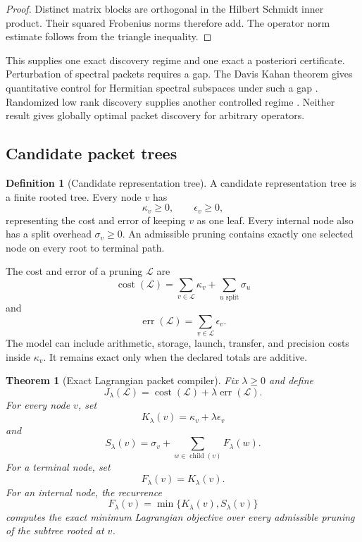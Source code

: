 \documentclass{aomart}
\newtheorem{theorem}{Theorem}[section]
\theoremstyle{definition}
\newtheorem{definition}[definition]{Definition}
\theoremstyle{remark}
\newcommand{\Lcal}{\mathcal L}
\newcommand{\cost}{\operatorname{cost}}
\newcommand{\err}{\operatorname{err}}
\begin{document}
\begin{proof}
Distinct matrix blocks are orthogonal in the Hilbert Schmidt inner product. Their squared Frobenius norms therefore add. The operator norm estimate follows from the triangle inequality.
\end{proof}

This supplies one exact discovery regime and one exact a posteriori certificate. Perturbation of spectral packets requires a gap. The Davis Kahan theorem gives quantitative control for Hermitian spectral subspaces under such a gap \cite{DavisKahan1970}. Randomized low rank discovery supplies another controlled regime \cite{HalkoMartinssonTropp2011,MartinssonTropp2020}. Neither result gives globally optimal packet discovery for arbitrary operators.

\subsection{Candidate packet trees}

\begin{definition}[Candidate representation tree]\label{def:candidate_tree}
A candidate representation tree is a finite rooted tree. Every node \(v\) has
\[
\kappa_v\geq0,
\qquad
\epsilon_v\geq0,
\]
representing the cost and error of keeping \(v\) as one leaf. Every internal node also has a split overhead \(\sigma_v\geq0\). An admissible pruning contains exactly one selected node on every root to terminal path.
\end{definition}

The cost and error of a pruning \(\Lcal\) are
\[
\cost(\Lcal)
=
\sum_{v\in\Lcal}\kappa_v
+
\sum_{u\text{ split}}\sigma_u
\]
and
\[
\err(\Lcal)=\sum_{v\in\Lcal}\epsilon_v.
\]
The model can include arithmetic, storage, launch, transfer, and precision costs inside \(\kappa_v\). It remains exact only when the declared totals are additive.

\begin{theorem}[Exact Lagrangian packet compiler]\label{thm:tree_compiler}
Fix \(\lambda\geq0\) and define
\[
J_\lambda(\Lcal)
=
\cost(\Lcal)
+
\lambda\err(\Lcal).
\]
For every node \(v\), set
\[
K_\lambda(v)
=
\kappa_v+\lambda\epsilon_v
\]
and
\[
S_\lambda(v)
=
\sigma_v
+
\sum_{w\in\operatorname{child}(v)}F_\lambda(w).
\]
For a terminal node, set
\[
F_\lambda(v)=K_\lambda(v).
\]
For an internal node, the recurrence
\[
\boxed{
F_\lambda(v)
=
\min\{K_\lambda(v),S_\lambda(v)\}
}
\]
computes the exact minimum Lagrangian objective over every admissible pruning of the subtree rooted at \(v\).
\end{theorem}
\end{document}
